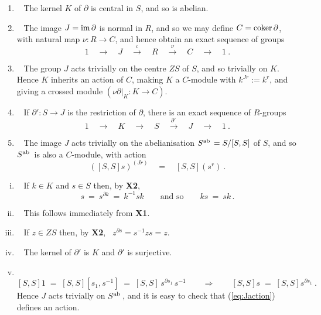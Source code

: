 \begin{lem}\quad
\begin{enumerate}[{\rm (i)}]
\item~  
The kernel $K$ of  $\partial$  is  central in $S$, and so is abelian.
\item~  
The image $J = \mathrm{im}\,\partial$ is normal in $R$,
and so we may define  $C = \mathrm{coker}\,\partial$,
with natural map $\nu : R \to C$, 
and hence obtain an exact sequence of groups
$$
1 \quad \longrightarrow \quad 
J \quad \stackrel{\iota}{\longrightarrow} \quad 
R \quad \stackrel{\nu}{\longrightarrow} \quad 
C \quad \longrightarrow \quad 
1~.
$$
\item~
The group  $J$ acts trivially on the centre  $ZS$  of  $S$,
and so trivially on $K$.
Hence  $K$  inherits an action of $C$, making $K$ a $C$-module 
with  $k^{Jr} := k^r$, 
and giving a crossed module $(\nu\partial|_{K} : K \to C)$.
\item~
If  $\partial' : S \to J$ is the restriction of $\partial$,
there is an exact sequence of $R$-groups
$$
1 \quad \longrightarrow \quad 
K \quad \longrightarrow \quad 
S \quad \stackrel{\partial'\,}{\longrightarrow} \quad 
J \quad \longrightarrow \quad 
1~.
$$
\item~
The image  $J$ acts trivially on the abelianisation  
$S^{\mathrm{ab}\,} = S/[S,S]$  of  $S$, and so  $S^{\mathrm{ab}\,}$
is also a $C$-module, with action
\begin{equation} \label{eq:Jaction}
([S,S]s)^{(Jr)} \quad = \quad [S,S](s^r)~.
\end{equation}
\end{enumerate}
\end{lem}
\begin{pf}\quad
\begin{enumerate}[(i)]
\item~
If  $k \in K$  and  $s \in S$ then, by \textbf{X2},
$$
s ~=~ s^{\partial k} ~=~ k^{-1}sk
\qquad \text{and so} \qquad
ks ~=~ sk\,.
$$
\item~
This follows immediately from \textbf{X1}.
\item~
If  $z \in ZS$ then, by \textbf{X2}, ~$z^{\partial s} = s^{-1}zs = z$.
\item~
The kernel of $\partial'$ is $K$ and $\partial'$ is surjective.
\item~
$$
[S,S]1 \;=\; [S,S][s_1,s^{-1}] \;=\; [S,S]\,s^{\partial s_1}\,s^{-1}
\qquad\Rightarrow\qquad
[S,S]s \;=\; [S,S]s^{\partial s_1}~.
$$
Hence $J$ acts trivially on $S^{\mathrm{ab}\,}$, and it is easy to check that 
(\ref{eq:Jaction}) defines an action.
\end{enumerate}
\end{pf}


